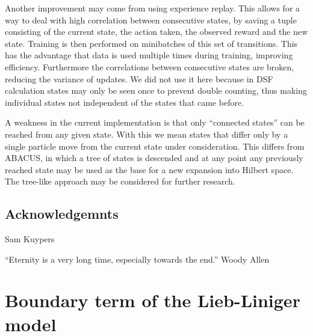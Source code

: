 \documentclass[11pt, a4paper]{report} %
\begin{document}
Another improvement may come from using experience replay\cite{mnih15_human_level_contr_throug_deep_reinf_learn,mnih13_playin_atari_with_deep_reinf_learn}.
This allows for a way to deal with high correlation between consecutive states, by saving a tuple consisting of the current state, the action taken, the observed reward and the new state.
Training is then performed on minibatches of this set of transitions.
This has the advantage that data is used multiple times during training, improving efficiency.
Furthermore the correlations between consecutive states are broken, reducing the variance of updates.
We did not use it here because in DSF calculation states may only be seen once to prevent double counting, thus making individual states not independent of the states that came before.

A weakness in the current implementation is that only ``connected states'' can be reached from any given state.
With this we mean states that differ only by a single particle move from the current state under consideration.
This differs from ABACUS, in which a tree of states is descended and at any point any previously reached state may be used as the base for a new expansion into Hilbert space.
The tree-like approach may be considered for further research.

\section*{Acknowledgemnts}
Sam Kuypers

``Eternity is a very long time, especially towards the end.'' Woody Allen
\appendix

\chapter{Boundary term of the Lieb-Liniger model}\label{cha:boundary}
\end{document}
